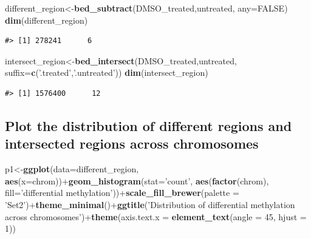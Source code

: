 \documentclass[9pt,a4paper]{extarticle}
\renewcommand{\KeywordTok}[1]{\textbf{{#1}}}
\renewcommand{\DataTypeTok}[1]{\textcolor[rgb]{0.50,0.00,0.00}{{#1}}}
\renewcommand{\DecValTok}[1]{\textcolor[rgb]{0.00,0.00,1.00}{{#1}}}
\renewcommand{\StringTok}[1]{\textcolor[rgb]{0.87,0.00,0.00}{{#1}}}
\renewcommand{\OtherTok}[1]{{#1}}
\renewcommand{\NormalTok}[1]{{#1}}
\begin{document}
\begin{Shaded}
\begin{Highlighting}[]
\NormalTok{different_region<-}\KeywordTok{bed_subtract}\NormalTok{(DMSO_treated,untreated, }\DataTypeTok{any=}\OtherTok{FALSE}\NormalTok{)}
\KeywordTok{dim}\NormalTok{(different_region)}
\end{Highlighting}
\end{Shaded}

\begin{verbatim}
#> [1] 278241      6
\end{verbatim}

\begin{Shaded}
\begin{Highlighting}[]
\NormalTok{intersect_region<-}\KeywordTok{bed_intersect}\NormalTok{(DMSO_treated,untreated, }\DataTypeTok{suffix=}\KeywordTok{c}\NormalTok{(}\StringTok{'.treated'}\NormalTok{,}\StringTok{'.untreated'}\NormalTok{))}
\KeywordTok{dim}\NormalTok{(intersect_region)}
\end{Highlighting}
\end{Shaded}

\begin{verbatim}
#> [1] 1576400      12
\end{verbatim}

\subsection{Plot the distribution of different regions and intersected
regions across
chromosomes}\label{plot-the-distribution-of-different-regions-and-intersected-regions-across-chromosomes}

\begin{Shaded}
\begin{Highlighting}[]
\NormalTok{p1<-}\KeywordTok{ggplot}\NormalTok{(}\DataTypeTok{data=}\NormalTok{different_region, }\KeywordTok{aes}\NormalTok{(}\DataTypeTok{x=}\NormalTok{chrom))+}\KeywordTok{geom_histogram}\NormalTok{(}\DataTypeTok{stat=}\StringTok{'count'}\NormalTok{, }\KeywordTok{aes}\NormalTok{(}\KeywordTok{factor}\NormalTok{(chrom), }\DataTypeTok{fill=}\StringTok{'differential methylation'}\NormalTok{))+}\KeywordTok{scale_fill_brewer}\NormalTok{(}\DataTypeTok{palette =} \StringTok{'Set2'}\NormalTok{)+}\KeywordTok{theme_minimal}\NormalTok{()+}\KeywordTok{ggtitle}\NormalTok{(}\StringTok{'Distribution of differential methylation across chromosomes'}\NormalTok{)+}\KeywordTok{theme}\NormalTok{(}\DataTypeTok{axis.text.x =} \KeywordTok{element_text}\NormalTok{(}\DataTypeTok{angle =} \DecValTok{45}\NormalTok{, }\DataTypeTok{hjust =} \DecValTok{1}\NormalTok{))}
\end{Highlighting}
\end{Shaded}
\end{document}

